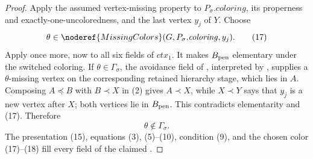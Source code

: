 \begin{proof}
Apply the assumed vertex-missing property to \(P_\sigma.\mathit{coloring}\),
its properness and exactly-one-uncoloredness, and the last vertex \(y_j\)
of \(Y\).  Choose
\[
 \theta\in\noderef{MissingColors}
       (G,P_\sigma.\mathit{coloring},y_j).                     \tag{17}
\]
Apply  once more,
now to all six fields of \(\mathit{ctx}_1\).  It makes
\(B_{\rm pen}\) elementary under the switched coloring.  If
\(\theta\in\Gamma_\sigma\), the avoidance field of
, interpreted by
, supplies a
\(\theta\)-missing vertex on the corresponding retained hierarchy stage,
which lies in \(A\).  Composing \(A\preccurlyeq B\) with \(B\prec X\)
in (2) gives \(A\prec X\), while \(X\prec Y\) says that \(y_j\) is a new
vertex after \(X\); both vertices lie in \(B_{\rm pen}\).  This contradicts
elementarity and (17).  Therefore
\[
                         \theta\notin\Gamma_\sigma.            \tag{18}
\]
The presentation (15), equations (3), (5)--(10), condition (9), and the
chosen color (17)--(18) fill every field of the claimed
.
\end{proof}
